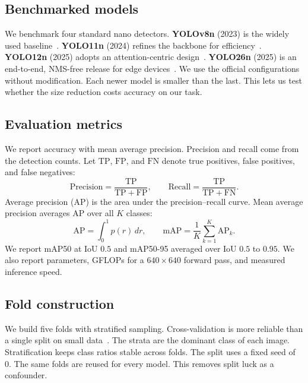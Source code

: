 \documentclass[conference]{IEEEtran}
\begin{document}
\subsection{Benchmarked models}
We benchmark four standard nano detectors. \textbf{YOLOv8n} (2023) is the widely
used baseline~\cite{jocher2023yolov8}. \textbf{YOLO11n} (2024) refines the
backbone for efficiency~\cite{jocher2024yolo11}. \textbf{YOLO12n} (2025) adopts
an attention-centric design~\cite{tian2025yolov12}. \textbf{YOLO26n} (2025) is
an end-to-end, NMS-free release for edge
devices~\cite{ultralytics2025yolo26}. We use the official configurations without
modification. Each newer model is smaller than the last. This lets us test
whether the size reduction costs accuracy on our task.

\subsection{Evaluation metrics}
We report accuracy with mean average precision. Precision and recall come from
the detection counts. Let $\mathrm{TP}$, $\mathrm{FP}$, and $\mathrm{FN}$ denote
true positives, false positives, and false negatives:
\begin{equation}
\mathrm{Precision} = \frac{\mathrm{TP}}{\mathrm{TP}+\mathrm{FP}},
\qquad
\mathrm{Recall} = \frac{\mathrm{TP}}{\mathrm{TP}+\mathrm{FN}} .
\end{equation}
Average precision (AP) is the area under the precision--recall curve. Mean
average precision averages AP over all $K$ classes:
\begin{equation}
\mathrm{AP} = \int_0^1 p(r)\,dr,
\qquad
\mathrm{mAP} = \frac{1}{K}\sum_{k=1}^{K}\mathrm{AP}_k .
\end{equation}
We report mAP50 at IoU $0.5$ and mAP50-95 averaged over IoU $0.5$ to $0.95$. We
also report parameters, GFLOPs for a $640\times640$ forward pass, and measured
inference speed.

\subsection{Fold construction}
We build five folds with stratified sampling. Cross-validation is more reliable
than a single split on small data~\cite{kohavi1995study}. The strata are the
dominant class of each image. Stratification keeps class ratios stable across
folds. The split uses a fixed seed of 0. The same folds are reused for every
model. This removes split luck as a confounder.
\end{document}
